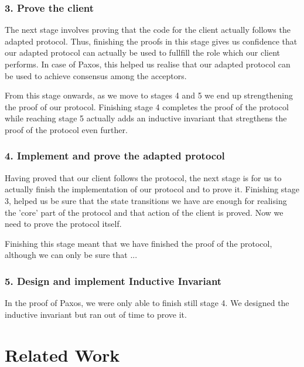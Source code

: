 \subsubsection{3. Prove the client}
The next stage involves proving that the code for the client actually follows
the adapted protocol. Thus, finishing the proofs in this stage gives us
confidence that our adapted protocol can actually be used to fullfill the role
which our client performs. In case of Paxos, this helped us realise that our
adapted protocol can be used to achieve consensus among the acceptors.

From this stage onwards, as we move to stages 4 and 5 we end up strengthening
the proof of our protocol. Finishing stage 4 completes the proof of the protocol
while reaching stage 5 actually adds an inductive invariant that stregthens the
proof of the protocol even further.

\subsubsection{4. Implement and prove the adapted protocol}
Having proved that our client follows the protocol, the next stage is for us
to actually finish the implementation of our protocol and to prove it. Finishing
stage 3, helped us be sure that the state transitions we have are enough for
realising the 'core' part of the protocol and that action of the client is proved.
Now we need to prove the protocol itself.

Finishing this stage meant that we have finished the proof of the protocol,
although we can only be sure that ...

\subsubsection{5. Design and implement Inductive Invariant}
In the proof of Paxos, we were only able to finish still stage 4. We designed
the inductive invariant but ran out of time to prove it.


\section{Related Work}
